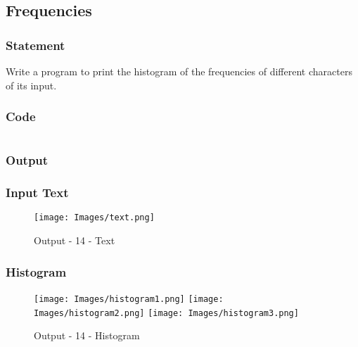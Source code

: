 \pagebreak
\subsection{Frequencies}
\subsubsection{Statement}
Write a program to print the histogram of the frequencies of different characters of its input.
\subsubsection{Code}
\inputminted[]{c}{./code/histogram.cpp}
\pagebreak

\subsubsection{Output}
\subsubsection*{Input Text}
\begin{figure}[!htb]
  \centering
  \texttt{[image: Images/text.png]}
  \label{Output-14-Text}
  \caption{Output - 14 - Text}
\end{figure}

\subsubsection*{Histogram}
\pagebreak
\vspace*{-2.3cm}
\begin{figure}[H]
  \centering
  \texttt{[image: Images/histogram1.png]}
  \texttt{[image: Images/histogram2.png]}
  \texttt{[image: Images/histogram3.png]}
  \label{Output-14-Histogram}
  \caption{Output - 14 - Histogram}
\end{figure}
\pagebreak
